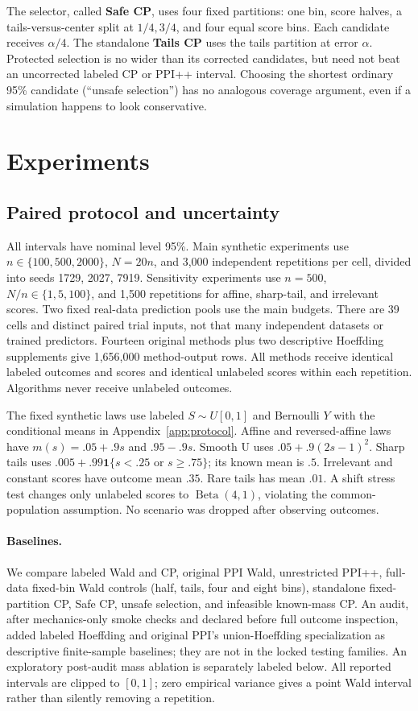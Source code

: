 \documentclass{article}
\begin{document}
The selector, called \textbf{Safe CP}, uses four fixed partitions: one bin, score halves, a tails-versus-center split at $1/4,3/4$, and four equal score bins. Each candidate receives $\alpha/4$. The standalone \textbf{Tails CP} uses the tails partition at error $\alpha$. Protected selection is no wider than its corrected candidates, but need not beat an uncorrected labeled CP or PPI++ interval. Choosing the shortest ordinary 95\% candidate (``unsafe selection'') has no analogous coverage argument, even if a simulation happens to look conservative.

\section{Experiments}\label{sec:experiments}
\subsection{Paired protocol and uncertainty}
All intervals have nominal level 95\%. Main synthetic experiments use $n\in\{100,500,2000\}$, $N=20n$, and 3,000 independent repetitions per cell, divided into seeds 1729, 2027, 7919. Sensitivity experiments use $n=500$, $N/n\in\{1,5,100\}$, and 1,500 repetitions for affine, sharp-tail, and irrelevant scores. Two fixed real-data prediction pools use the main budgets. There are 39 cells and \TotalTrialInputs{} distinct paired trial inputs, not that many independent datasets or trained predictors. Fourteen original methods plus two descriptive Hoeffding supplements give 1,656,000 method-output rows. All methods receive identical labeled outcomes and scores and identical unlabeled scores within each repetition. Algorithms never receive unlabeled outcomes.

The fixed synthetic laws use labeled $S\sim U[0,1]$ and Bernoulli $Y$ with the conditional means in Appendix~\ref{app:protocol}. Affine and reversed-affine laws have $m(s)=.05+.9s$ and $.95-.9s$. Smooth U uses $.05+.9(2s-1)^2$. Sharp tails uses $.005+.99\mathbf1\{s<.25\text{ or }s\geq.75\}$; its known mean is $.5$. Irrelevant and constant scores have outcome mean $.35$. Rare tails has mean $.01$. A shift stress test changes only unlabeled scores to $\operatorname{Beta}(4,1)$, violating the common-population assumption. No scenario was dropped after observing outcomes.

\paragraph{Baselines.}
We compare labeled Wald and CP, original PPI Wald, unrestricted PPI++, full-data fixed-bin Wald controls (half, tails, four and eight bins), standalone fixed-partition CP, Safe CP, unsafe selection, and infeasible known-mass CP. An audit, after mechanics-only smoke checks and declared before full outcome inspection, added labeled Hoeffding and original PPI's union-Hoeffding specialization as descriptive finite-sample baselines; they are not in the locked testing families. An exploratory post-audit mass ablation is separately labeled below. All reported intervals are clipped to $[0,1]$; zero empirical variance gives a point Wald interval rather than silently removing a repetition.
\end{document}
